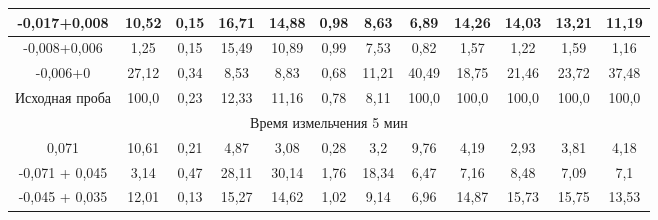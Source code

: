 {\begin{longtable}[c]{|p{}ccccccccccc|}
\multicolumn{1}{|c|}{-0,017+0,008} & \multicolumn{1}{c|}{10,52} & \multicolumn{1}{c|}{0,15} & \multicolumn{1}{c|}{16,71} & \multicolumn{1}{c|}{14,88} & \multicolumn{1}{c|}{0,98} & \multicolumn{1}{c|}{8,63} & \multicolumn{1}{c|}{6,89} & \multicolumn{1}{c|}{14,26} & \multicolumn{1}{c|}{14,03} & \multicolumn{1}{c|}{13,21} & 11,19 \\ \hline
\multicolumn{1}{|c|}{-0,008+0,006} & \multicolumn{1}{c|}{1,25} & \multicolumn{1}{c|}{0,15} & \multicolumn{1}{c|}{15,49} & \multicolumn{1}{c|}{10,89} & \multicolumn{1}{c|}{0,99} & \multicolumn{1}{c|}{7,53} & \multicolumn{1}{c|}{0,82} & \multicolumn{1}{c|}{1,57} & \multicolumn{1}{c|}{1,22} & \multicolumn{1}{c|}{1,59} & 1,16 \\ \hline
\multicolumn{1}{|c|}{-0,006+0} & \multicolumn{1}{c|}{27,12} & \multicolumn{1}{c|}{0,34} & \multicolumn{1}{c|}{8,53} & \multicolumn{1}{c|}{8,83} & \multicolumn{1}{c|}{0,68} & \multicolumn{1}{c|}{11,21} & \multicolumn{1}{c|}{40,49} & \multicolumn{1}{c|}{18,75} & \multicolumn{1}{c|}{21,46} & \multicolumn{1}{c|}{23,72} & 37,48 \\ \hline
\multicolumn{1}{|c|}{Исходная проба} & \multicolumn{1}{c|}{100,0} & \multicolumn{1}{c|}{0,23} & \multicolumn{1}{c|}{12,33} & \multicolumn{1}{c|}{11,16} & \multicolumn{1}{c|}{0,78} & \multicolumn{1}{c|}{8,11} & \multicolumn{1}{c|}{100,0} & \multicolumn{1}{c|}{100,0} & \multicolumn{1}{c|}{100,0} & \multicolumn{1}{c|}{100,0} & 100,0\\ \hline
\multicolumn{12}{|c|}{Время измельчения 5 мин} \\ \hline
\multicolumn{1}{|c|}{0,071} & \multicolumn{1}{c|}{10,61} & \multicolumn{1}{c|}{0,21} & \multicolumn{1}{c|}{4,87} & \multicolumn{1}{c|}{3,08} & \multicolumn{1}{c|}{0,28} & \multicolumn{1}{c|}{3,2} & \multicolumn{1}{c|}{9,76} & \multicolumn{1}{c|}{4,19} & \multicolumn{1}{c|}{2,93} & \multicolumn{1}{c|}{3,81} & 4,18 \\ \hline
\multicolumn{1}{|c|}{-0,071 + 0,045} & \multicolumn{1}{c|}{3,14} & \multicolumn{1}{c|}{0,47} & \multicolumn{1}{c|}{28,11} & \multicolumn{1}{c|}{30,14} & \multicolumn{1}{c|}{1,76} & \multicolumn{1}{c|}{18,34} & \multicolumn{1}{c|}{6,47} & \multicolumn{1}{c|}{7,16} & \multicolumn{1}{c|}{8,48} & \multicolumn{1}{c|}{7,09} & 7,1 \\ \hline
\multicolumn{1}{|c|}{-0,045 + 0,035} & \multicolumn{1}{c|}{12,01} & \multicolumn{1}{c|}{0,13} & \multicolumn{1}{c|}{15,27} & \multicolumn{1}{c|}{14,62} & \multicolumn{1}{c|}{1,02} & \multicolumn{1}{c|}{9,14} & \multicolumn{1}{c|}{6,96} & \multicolumn{1}{c|}{14,87} & \multicolumn{1}{c|}{15,73} & \multicolumn{1}{c|}{15,75} & 13,53 \\ \hline

\end{longtable}}
